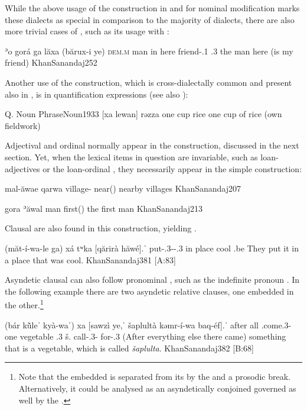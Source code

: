 While the above usage of the  construction in \JSan and \JSul for nominal modification
marks these dialects as special in comparison to the majority of  dialects, there are also more {trivial} cases of ,  such as its usage with  \secns:


{ʾo gorá ga\cb{} lăxa (bărux-i \cb{}ye)}
{\textsc{dem.m} man in\cb{} here friend-\poss.1\sg{} \cb{}\cop.3\masc}
{the man here (is my friend)}
{KhanSanandaj}{252}

Another use of the  construction, which is  cross-dialectally common and present also in \JSan, is in quantification expressions (see also ):

\acex
{Q. Noun Phrase}{Noun}{1933}
{[xa lewan] rəzza}
{one cup rice}
{one cup of rice}
{}{(own fieldwork)}

Adjectival and ordinal \secns normally appear in the  construction, discussed in the next section. Yet, when the lexical items in question are invariable, such as loan-adjectives or the loan-ordinal , they necessarily appear in the simple  construction:

{mal-ăwae qarwa}
{village-\pl{} near(\invar)}
{nearby villages}
{KhanSanandaj}{207}

{gora ʾăwal}
{man first(\invar)} 
{the first man}
{KhanSanandaj}{213}

 

Clausal \secns are also found in this construction, yielding .

{(măt-í-wa-le ga\cb{}) xá \cb{}tʷka [qărirà hăwé].ˈ}
{put-\agent.3\pl-\pst-\patient.3\masc{} in\cb{} \indef{} \cb{}place cool \subj.be}
{They put it in a place that was cool.}
{KhanSanandaj}{381 {[A:83]}}


Asyndetic clausal \secns can also follow pronominal \prims, such as the indefinite pronoun . In the following example there are two asyndetic relative clauses, one embedded in the other.\footnote{Note that the embedded  is separated from its \prim {} by the  and a prosodic break. Alternatively, it could be analysed as an asyndetically conjoined  governed as well  by the \prim {}.}


{(bár kŭ̀leˈ kyà-waˈ) xa\cb{} [sawzì \cb{}ye,ˈ šaplultà kəmr-í-wa baq-éf].ˈ}
{after all \ind.come.3\fem-\pst{} one\cb{} vegetable \cb{}\cop.3\masc{} š. call-\agent.3\pl-\pst{} for-\poss.3\masc{}}
{(After everything else there came) something that is a vegetable, which is called \textit{šaplulta}.}
{KhanSanandaj}{382 {[B:68]}}

